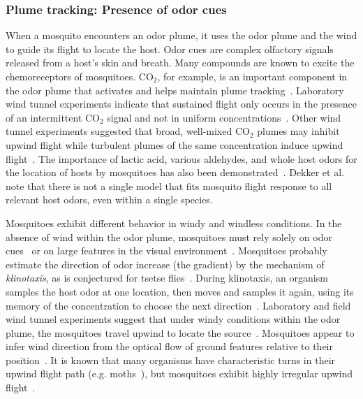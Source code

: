 \documentclass[10pt]{article}
\begin{document}
\subsubsection*{Plume tracking: Presence of odor cues}
When a mosquito encounters an odor plume, it uses the odor plume and the wind to guide its flight to locate the host.
Odor cues are complex olfactory signals released from a host's skin and breath. Many compounds are known to excite the chemoreceptors of mosquitoes.
CO$_2$, for example, is an important component in the odor plume that activates and helps maintain plume tracking~\cite{Bowen1991,Gibson1999,Gillies1980}. 
Laboratory wind tunnel experiments indicate that
sustained flight only occurs in the presence of an intermittent CO$_2$ signal and not in uniform
concentrations~\cite{Gillies1980}.  Other wind tunnel experiments suggested that broad,
well-mixed CO$_2$ plumes may inhibit upwind flight while turbulent plumes of the same concentration induce
upwind flight~\cite{Dekker2001,Dekker2005,Dekker2011}.
 The importance of lactic acid, various
aldehydes, and whole host odors for the location of hosts by mosquitoes has also been demonstrated~\cite{Bowen1991,Syed2009,Dekker2005,Dekker2011}. Dekker et al.~\cite{Dekker2011} note that there is not a single model that fits mosquito flight response to all relevant host odors, even within a single species.

 

Mosquitoes exhibit different behavior in windy and windless conditions. In the absence of wind within the odor plume, mosquitoes must rely solely on odor cues~\cite{Vickers2000} or on large features in the visual environment~\cite{Bidlingmayer1994}. Mosquitoes probably estimate the direction of odor increase (the gradient) by the mechanism of \textit{klinotaxis}, as is conjectured for tsetse flies~\cite{Carde1996}. During klinotaxis, an organism samples the host odor at one location, then moves and samples it again, using its memory of the concentration to choose the next direction~\cite{Vickers2000}.
%
Laboratory and field wind tunnel experiments suggest that under windy conditions within the odor plume, the mosquitoes travel upwind to locate the source~\cite{Cooperband2006, Dekker2005,Dekker2001}. Mosquitoes appear to infer wind direction from the optical flow of ground features relative to their position~\cite{Carde1996}.
It is known that many organisms have characteristic turns in their upwind flight path (e.g. moths~\cite{Carde1996,Vickers2000}), but mosquitoes exhibit highly irregular upwind flight~\cite{Davis1996}.
\end{document}
